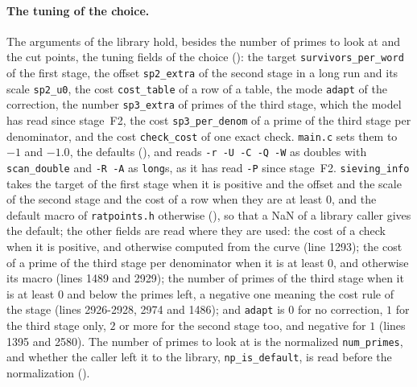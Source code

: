 \paragraph{The tuning of the choice.} The arguments of the library hold, besides the number of
primes to look at and the cut points, the tuning fields of the choice
(): the target \verb|survivors_per_word| of the first stage, the
offset \verb|sp2_extra| of the second stage in a long run and its scale \verb|sp2_u0|, the cost
\verb|cost_table| of a row of a table, the mode \verb|adapt| of the correction, the number
\verb|sp3_extra| of primes of the third stage, which the model has read since stage~F2, the cost
\verb|sp3_per_denom| of a prime of the third stage per denominator, and the cost \verb|check_cost|
of one exact check. \verb|main.c| sets them to $-1$ and $-1.0$, the defaults
(), and reads \verb|-r -U -C -Q -W| as doubles with \verb|scan_double| and
\verb|-R -A| as \verb|long|s, as it has read \verb|-P| since stage~F2. \verb|sieving_info| takes the
target of the first stage when it is positive and the offset and the scale of the second stage and
the cost of a row when they are at least $0$, and the default macro of \verb|ratpoints.h| otherwise
(), so that a NaN of a library caller gives the default; the
other fields are read where they are used: the cost of a check when it is positive, and otherwise
computed from the curve (line 1293); the cost of a prime of the third stage per denominator when it
is at least $0$, and otherwise its macro (lines 1489 and 2929); the number of primes of the third
stage when it is at least $0$ and below the primes left, a negative one meaning the cost rule of the
stage (lines 2926-2928, 2974 and 1486); and \verb|adapt| is $0$ for no correction, $1$ for the third
stage only, $2$ or more for the second stage too, and negative for $1$ (lines 1395 and 2580). The
number of primes to look at is the normalized \verb|num_primes|, and whether the caller left it to
the library, \verb|np_is_default|, is read before the normalization
().

